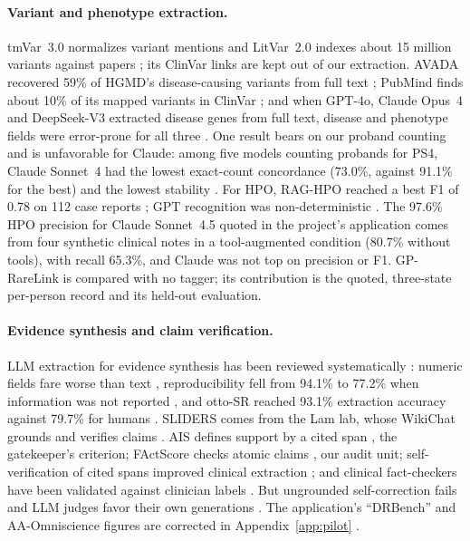 \documentclass{article} %
\begin{document}
\paragraph{Variant and phenotype extraction.} tmVar~3.0 normalizes variant mentions \citep{wei2022_tmvar3} and LitVar~2.0 indexes about 15 million variants against papers \citep{allot2023_litvar2}; its ClinVar links are kept out of our extraction. AVADA recovered 59\% of HGMD's disease-causing variants from full text \citep{birgmeier2020_avada}; PubMind finds about 10\% of its mapped variants in ClinVar \citep{wang2025_pubmind}; and when GPT-4o, Claude Opus~4 and DeepSeek-V3 extracted disease genes from full text, disease and phenotype fields were error-prone for all three \citep{yin2025_llm_disease_genes}. One result bears on our proband counting and is unfavorable for Claude: among five models counting probands for PS4, Claude Sonnet~4 had the lowest exact-count concordance (73.0\%, against 91.1\% for the best) and the lowest stability \citep{murugan2026_reasoning_llm_ps4}. For HPO, RAG-HPO reached a best F1 of 0.78 on 112 case reports \citep{garcia2025_raghpo}; GPT recognition was non-deterministic \citep{groza2024_gpt_hpo}. The 97.6\% HPO precision for Claude Sonnet~4.5 quoted in the project's application \citep{larsen2026_hpo_mcp} comes from four synthetic clinical notes in a tool-augmented condition (80.7\% without tools), with recall 65.3\%, and Claude was not top on precision or F1. GP-RareLink is compared with no tagger; its contribution is the quoted, three-state per-person record and its held-out evaluation.

\paragraph{Evidence synthesis and claim verification.} LLM extraction for evidence synthesis has been reviewed systematically \citep{Shankar2026PerformanceLarge}: numeric fields fare worse than text \citep{kataoka2025_gpt4o_o3_extraction}, reproducibility fell from 94.1\% to 77.2\% when information was not reported \citep{Jensen2025Chatgpt4oCan}, and otto-SR reached 93.1\% extraction accuracy against 79.7\% for humans \citep{cao2025_ottosr}. SLIDERS comes from the Lam lab, whose WikiChat grounds and verifies claims \citep{semnani2023_wikichat}. AIS defines support by a cited span \citep{rashkin2023_ais}, the gatekeeper's criterion; FActScore checks atomic claims \citep{min2023_factscore}, our audit unit; self-verification of cited spans improved clinical extraction \citep{gero2023_self_verification}; and clinical fact-checkers have been validated against clinician labels \citep{Chung2026VerifyingFacts}. But ungrounded self-correction fails \citep{huang2024_no_self_correct} and LLM judges favor their own generations \citep{zheng2023_llm_judge,Panickssery2024LlmEvaluators}. The application's ``DRBench'' and AA-Omniscience figures are corrected in Appendix~\ref{app:pilot} \citep{rao2026_reference_hallucination,du2025_deepresearchbench,jackson2025_aa_omniscience}.
\end{document}
